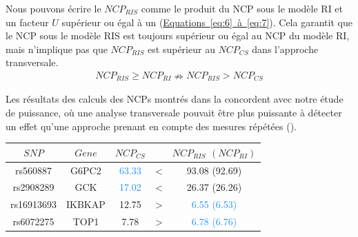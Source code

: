 \documentclass[11pt, a4paper]{article}
\begin{document}
\par{%
Nous pouvons écrire le $NCP_{RIS}$ comme le produit du NCP sous le modèle RI et un facteur $U$ supérieur ou égal à un (\hyperref[eq:6]{Equations~\ref*{eq:6}~à~\ref{eq:7}}).
Cela garantit que le NCP sous le modèle RIS est toujours supérieur ou égal au NCP du modèle RI, mais n'implique pas que $NCP_{RIS}$ est supérieur au $NCP_{CS}$ dans l'approche transversale.
\begin{eqnarray}NCP_{RIS} \geq NCP_{RI} \nRightarrow NCP_{RIS} > NCP_{CS}\end{eqnarray}
}
\newpage
\par{Les résultats des calculs des  NCPs montrés dans la  concordent avec notre étude de puissance,
où une analyse transversale pouvait être plus puissante à détecter un effet qu'une approche prenant en compte des mesures répétées ().
\begin{table}[h]
    \begin{center}
        \begin{tabular}{ccccc}
            \hline
            $SNP$ & $Gene$ & $NCP_{CS}$ &  & $NCP_{RIS}$ $(NCP_{RI})$ \\
            \hline
            rs560887 & G6PC2 & \textcolor{dodgerblue}{63.33} & \textcolor{maroon2}{\LARGE <} & \textcolor{firebrick2}{93.08 (92.69)} \\
            rs2908289 & GCK & \textcolor{dodgerblue}{17.02} & \textcolor{maroon2}{\LARGE <} & \textcolor{firebrick2}{26.37 (26.26)} \\
            rs16913693 & IKBKAP & \textcolor{firebrick2}{12.75} & \textcolor{maroon2}{\LARGE >} & \textcolor{dodgerblue}{6.55 (6.53)} \\
            rs6072275 & TOP1 & \textcolor{firebrick2}{7.78} & \textcolor{maroon2}{\LARGE >} & \textcolor{dodgerblue}{6.78 (6.76)} \\
            \hline
        \end{tabular}
        \label{tab:NCP}
    \end{center}
\end{table}
\begin{figure}[h]
    \begin{center}
        \\
        \label{fig:NCP}
    \end{center}
\end{figure}
}
\end{document}
